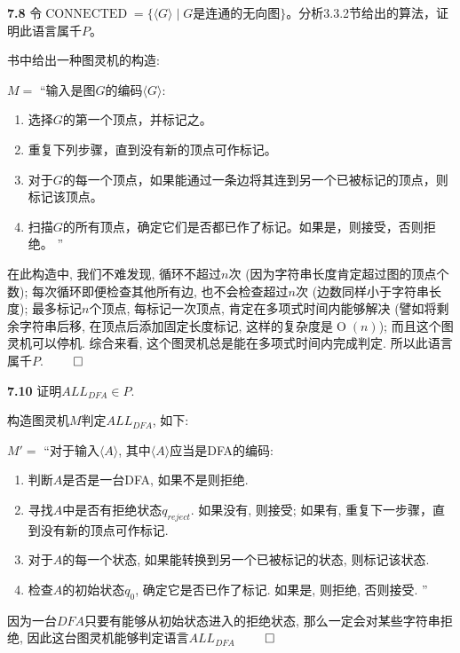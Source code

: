 \documentclass[UTF8]{report}
\newcommand{\problem}[1]{{\setlength{\parskip}{10pt}\noindent \bf{#1}}}
\renewenvironment{proof}{{\setlength{\parskip}{7pt}\noindent\hskip 2em \bf 证明 \quad}}{\hfill$\qed$\par}
\begin{document}
\problem{7.8} 令$\operatorname*{CONNECTED} = \{\langle G \rangle \mid G \text{是连通的无向图}\}$。分析3.3.2节给出的算法，证明此语言属千$P$。

\begin{proof}
    书中给出一种图灵机的构造:
    
    $M =$ ``输入是图$G$的编码$\langle G \rangle$:
    \begin{enumerate}
        \item 选择$G $的第一个顶点，并标记之。
        \item 重复下列步骤，直到没有新的顶点可作标记。
        \item 对于$G $的每一个顶点，如果能通过一条边将其连到另一个已被标记的顶点，则标记该顶点。
        \item 扫描$G $的所有顶点，确定它们是否都已作了标记。如果是，则接受，否则拒绝。
        ''
    \end{enumerate}
    
    在此构造中, 我们不难发现, 循环不超过$n$次 (因为字符串长度肯定超过图的顶点个数); 每次循环即便检查其他所有边, 也不会检查超过$n$次 (边数同样小于字符串长度); 最多标记$n$个顶点, 每标记一次顶点, 肯定在多项式时间内能够解决 (譬如将剩余字符串后移, 在顶点后添加固定长度标记, 这样的复杂度是$\operatorname*{O}(n)$); 而且这个图灵机可以停机. 综合来看, 这个图灵机总是能在多项式时间内完成判定. 所以此语言属千$P$.
\end{proof}

\problem{7.10} 证明$ALL_{DFA} \in P$.

\begin{proof}
    构造图灵机$M$判定$ALL_{DFA}$, 如下:

    $M' =$ ``对于输入$\langle A \rangle$, 其中$\langle A \rangle$应当是DFA的编码:
    \begin{enumerate}
        \item 判断$A$是否是一台DFA, 如果不是则拒绝.
        \item 寻找$A$中是否有拒绝状态$q_{reject}$. 如果没有, 则接受; 如果有, 重复下一步骤，直到没有新的顶点可作标记.
        \item 对于$A$的每一个状态, 如果能转换到另一个已被标记的状态, 则标记该状态.
        \item 检查$A$的初始状态$q_{0}$, 确定它是否已作了标记. 如果是, 则拒绝, 否则接受.
        ''
    \end{enumerate}

    因为一台$DFA$只要有能够从初始状态进入的拒绝状态, 那么一定会对某些字符串拒绝, 因此这台图灵机能够判定语言$ALL_{DFA}$
\end{proof}
\end{document}
